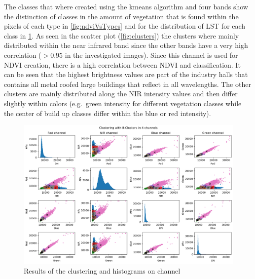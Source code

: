 \documentclass[a4paper, english]{article}
\begin{document}
%
The classes that where created using the kmeans algorithm and four bands show the distinction of classes in the amount of vegetation that is found within the pixels of each type in \cref{fig:ndviVsTypes} and for the distribution of \ac{LST} for each class in \cref{fig:scatterLstNDVI}.
As seen in the scatter plot (\cref{fig:clusters}) the clusters where mainly distributed within the near infrared band since the other bands have a very high correlation ($>0.95$ in the investigated images).
Since this channel is used for \ac{NDVI} creation, there is a high correlation between \ac{NDVI} and classification.
It can be seen that the highest brightness values are part of the industry halls that contains all metal roofed large buildings that reflect in all wavelengths. 
The other clusters are mainly distributed along the \ac{NIR} intensity values and then differ slightly within colors (e.g.~green intensity for different vegetation classes while the center of build up classes differ within the blue or red intensity).
\begin{figure}[!htbp]
    \includegraphics[width=\textwidth]{img/ScatterplotClustersAndHist.png}
    \caption{Results of the clustering and histograms on channel\label{fig:scatterLstNDVI}}
\end{figure}
%
\end{document}
